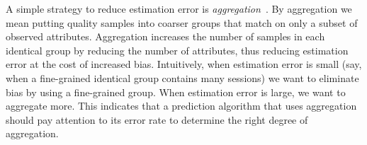 

\label{subsec:aggregation}
A simple strategy to reduce estimation error is {\it aggregation}~\cite{any citation?}.  By aggregation we mean putting quality samples into coarser groups that match on only a subset of observed attributes.  Aggregation increases the number of samples in each identical group by reducing the number of attributes, thus reducing estimation error at the cost of increased bias. 
Intuitively, when estimation error is small (say, when a fine-grained identical group contains many sessions) we want to eliminate bias by using a fine-grained group.  When estimation error is large, we want to aggregate more.    This indicates that a prediction algorithm that uses aggregation should pay attention to its error rate to determine the right degree of aggregation.


